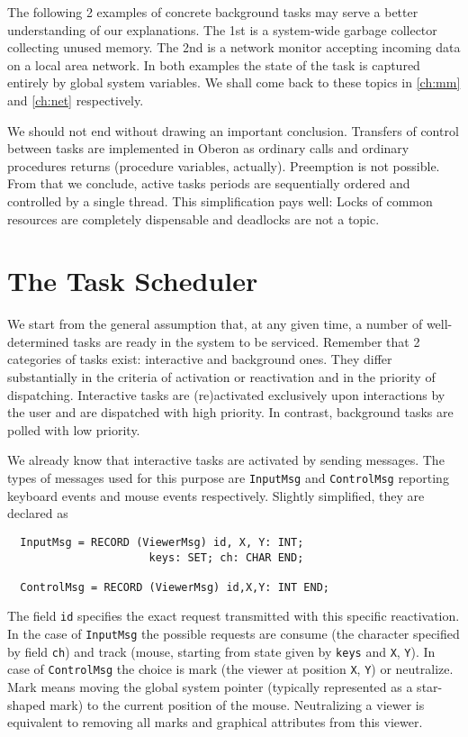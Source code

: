 The following 2 examples of concrete background tasks may serve a better understanding of
our explanations. The 1st is a system-wide garbage collector collecting unused memory.
The 2nd is a network monitor accepting incoming data on a local area network. In both
examples the state of the task is captured entirely by global system variables. We shall
come back to these topics in \ref{ch:mm} and \ref{ch:net} respectively.

We should not end without drawing an important conclusion. Transfers of control between tasks
are implemented in Oberon as ordinary calls and ordinary procedures returns (procedure
variables, actually). Preemption is not possible. From that we conclude, active tasks periods
are sequentially ordered and controlled by a single thread. This simplification pays well:
Locks of common resources are completely dispensable and deadlocks are not a topic.

\section{The Task Scheduler}
\label{sec:scheduler}
We start from the general assumption that, at any given time, a number of well-determined
tasks are ready in the system to be serviced. Remember that 2 categories of tasks exist:
interactive and background ones. They differ substantially in the criteria of activation
or reactivation and in the priority of dispatching. Interactive tasks are (re)activated
exclusively upon interactions by the user and are dispatched with high priority.
In contrast, background tasks are polled with low priority.

We already know that interactive tasks are activated by sending messages. The types of messages
used for this purpose are \verb|InputMsg| and \verb|ControlMsg| reporting keyboard events
and mouse events respectively. Slightly simplified, they are declared as
\begin{verbatim}
  InputMsg = RECORD (ViewerMsg) id, X, Y: INT;
                      keys: SET; ch: CHAR END;

  ControlMsg = RECORD (ViewerMsg) id,X,Y: INT END;
\end{verbatim}
The field \verb|id| specifies the exact request transmitted with this specific reactivation.
In the case of \verb|InputMsg| the possible requests are consume (the character specified
by field \verb|ch|) and track (mouse, starting from state given by \verb|keys| and \verb|X|,
\verb|Y|). In case of \verb|ControlMsg| the choice is mark (the viewer at position \verb|X|,
\verb|Y|) or neutralize. Mark means moving the global system pointer (typically represented
as a star-shaped mark) to the current position of the mouse. Neutralizing a viewer
is equivalent to removing all marks and graphical attributes from this viewer.

